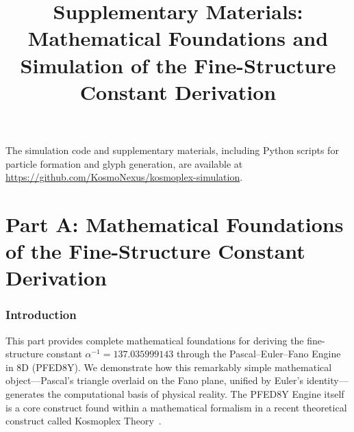 \documentclass[pdflatex,sn-mathphys-num]{sn-jnl}
\theoremstyle{thmstyleone}
\theoremstyle{thmstyletwo}
\theoremstyle{thmstylethree}
\begin{document}
\title[Supplementary Materials: Fine-Structure Constant Derivation]{Supplementary Materials: Mathematical Foundations and Simulation of the Fine-Structure Constant Derivation}

\author*[1]{ }




\maketitle

The simulation code and supplementary materials, including Python scripts for particle formation and glyph generation, are available at \url{https://github.com/KosmoNexus/kosmoplex-simulation}.

\part*{Part A: Mathematical Foundations of the Fine-Structure Constant Derivation}

\section{Introduction}\label{sec:s1-intro}

This part provides complete mathematical foundations for deriving the fine-structure constant $\alpha^{-1} = 137.035999143$ through the Pascal--Euler--Fano Engine in 8D (PFED8Y). We demonstrate how this remarkably simple mathematical object---Pascal's triangle overlaid on the Fano plane, unified by Euler's identity---generates the computational basis of physical reality. The PFED8Y Engine itself is a core construct found within a mathematical formalism in a recent theoretical construct called Kosmoplex Theory~\cite{macedonia2025principia}.
\end{document}

